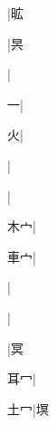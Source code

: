 \begin{multicols}{2}
{{\cjk{}{\cnsym{}　}{\cnsym{}　}{\cnsym{}　}}|{\cjk{}昿}\par
{\cjk{}{\cnsym{}　}{\cnsym{}　}{\cnsym{}　}}|{\cjk{}昗}\par
{\cjk{}{\cnsym{}　}{\cnsym{}　}{\cnsym{}　}}|{}\par
{一}|{}\par
{\cjk{}{\cnsym{}　}{\cnsym{}　}火}|{}\par
{}|{}\par
{}|{}\par
{\cjk{}{\cnsym{}　}木{宀}}|{}\par
{\cjk{}{\cnsym{}　}車{宀}}|{}\par
{}|{}\par
{}|{}\par
{}|{\cjk{}冥}\par
{\cjk{}{\cnsym{}　}耳{\cnxHanaA{}冖}}|{}\par
{\cjk{}{\cnsym{}　}土{\cnxHanaA{}冖}}|{\cjk{}塓}\par
}
\end{multicols}
